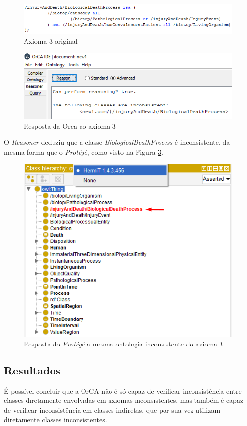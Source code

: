 \documentclass{bcc}
\begin{document}
\begin{figure}[H]
\centering
\includegraphics[width=.8\textwidth]{Figuras/axiomai_3_o.png}
\caption{Axioma 3 original} 
\label{fig:axiomai_3_o}
\end{figure}

\begin{figure}[H]
\centering
\includegraphics[width=.6\textwidth]{Figuras/axiomai_3_res.png}
\caption{Resposta da Orca ao axioma 3} 
\label{fig:axiomai_3_res}
\end{figure}

O \textit{Reasoner} deduziu que a classe \textit{BiologicalDeathProcess} é inconsistente, da mesma forma que o \textit{Protégé}, como visto na Figura \ref{fig:axiomai_3_protege}.

\begin{figure}[H]
\centering
\includegraphics[width=.5\textwidth]{Figuras/axiomai_3_protege.png}
\caption{Resposta do \textit{Protégé} a mesma ontologia inconsistente do axioma 3} 
\label{fig:axiomai_3_protege}
\end{figure}

\subsection{Resultados}
É possível concluir que a OrCA não é só capaz de verificar inconsistência entre classes diretamente envolvidas em axiomas inconsistentes, mas também é capaz de verificar inconsistência em classes indiretas, que por sua vez utilizam diretamente classes inconsistentes.
\end{document}
